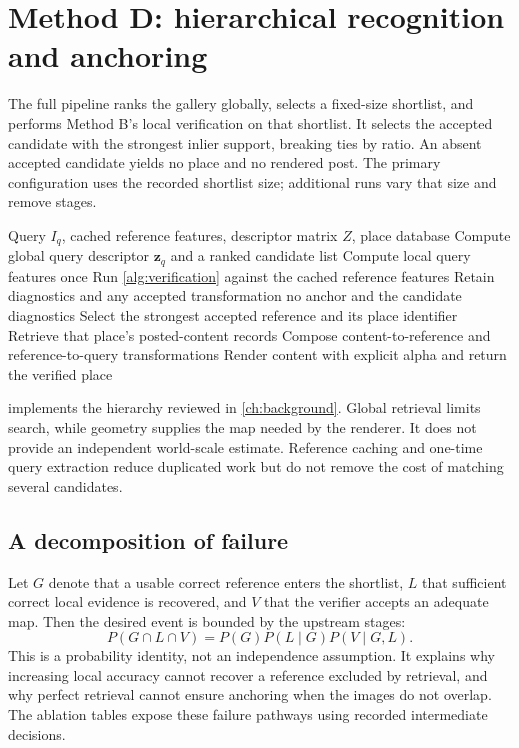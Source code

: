 \section{Method D: hierarchical recognition and anchoring}
The full pipeline ranks the gallery globally, selects a fixed-size shortlist, and performs Method B's local verification on that shortlist. It selects the accepted candidate with the strongest inlier support, breaking ties by ratio. An absent accepted candidate yields no place and no rendered post. The primary configuration uses the recorded shortlist size; additional runs vary that size and remove stages.

\begin{algorithm}[htbp]
\caption{Hierarchical place and content query}\label{alg:full}
\begin{algorithmic}[1]
\Require Query $I_q$, cached reference features, descriptor matrix $Z$, place database
\State Compute global query descriptor $\mathbf z_q$ and a ranked candidate list
\State Compute local query features once
\State Run \cref{alg:verification} against the cached reference features
\State Retain diagnostics and any accepted transformation
\EndFor
{}
\State \Return no anchor and the candidate diagnostics
\EndIf
\State Select the strongest accepted reference and its place identifier
\State Retrieve that place's posted-content records
\State Compose content-to-reference and reference-to-query transformations
\State Render content with explicit alpha and return the verified place
\end{algorithmic}
\end{algorithm}

 implements the hierarchy reviewed in \cref{ch:background}. Global retrieval limits search, while geometry supplies the map needed by the renderer. It does not provide an independent world-scale estimate. Reference caching and one-time query extraction reduce duplicated work but do not remove the cost of matching several candidates.

\subsection{A decomposition of failure}
Let $G$ denote that a usable correct reference enters the shortlist, $L$ that sufficient correct local evidence is recovered, and $V$ that the verifier accepts an adequate map. Then the desired event is bounded by the upstream stages:
\begin{equation}
 P(G\cap L\cap V)=P(G)P(L\mid G)P(V\mid G,L).
\end{equation}
This is a probability identity, not an independence assumption. It explains why increasing local accuracy cannot recover a reference excluded by retrieval, and why perfect retrieval cannot ensure anchoring when the images do not overlap. The ablation tables expose these failure pathways using recorded intermediate decisions.

